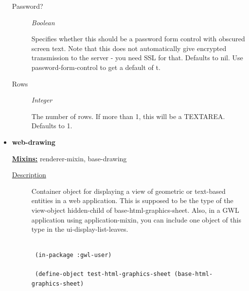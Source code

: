 \documentclass [11pt]{book}
\begin{document}
\begin{itemize}
\begin{description}
\item [Password?]
\emph{Boolean}

 Specifies whether this should be a password form control with obscured screen text.
Note that this does not automatically give encrypted transmission to the server - you need SSL
for that. Defaults to nil. Use password-form-control to get a default of t.




\item [Rows]
\emph{Integer}

 The number of rows. If more than 1, this will be a TEXTAREA. Defaults to 1.




\end{description}







\item {}
\label{prim:web-drawing}
\textbf{web-drawing}


\textbf{
\underline{Mixins:}} renderer-mixin, base-drawing





\begin{description}

\item [
\underline{Description}]


Container object for displaying a view of geometric 
or text-based entities in a web application. This is supposed to be the type of the
view-object hidden-child of base-html-graphics-sheet. Also, in a GWL application using 
application-mixin, you can include one object of this type in the ui-display-list-leaves.




\end{description}




\begin{figure}
\begin{lrbox}{\boxedverb}
\begin{minipage}{\linewidth}
{\small

\begin{verbatim}

 (in-package :gwl-user)

 (define-object test-html-graphics-sheet (base-html-graphics-sheet)
    

\end{verbatim}}
\end{minipage}
\end{lrbox}
\end{figure}
\end{itemize}
\end{document}
